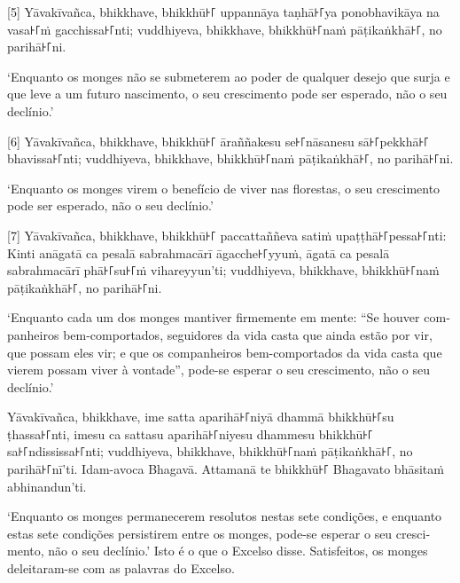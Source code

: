 \enlargethispage{2\baselineskip}

[5] Yāvakīvañca, bhikkhave, bhikkhū꜔꜒ uppannāya taṇhā꜔꜒ya ponobhavikāya na vasa꜔꜒ṁ
gacchissa꜔꜒nti; vuddhiyeva, bhikkhave, bhikkhū꜔꜒naṁ pāṭikaṅkhā꜔꜒, no parihā꜔꜒ni.

\begin{english}
  `Enquanto os monges não se submeterem ao poder de qualquer desejo que surja e
  que leve a um futuro nascimento, o seu crescimento pode ser esperado, não o
  seu declínio.'
\end{english}

[6] Yāvakīvañca, bhikkhave, bhikkhū꜔꜒ āraññakesu se꜔꜒nāsanesu sā꜔꜒pekkhā꜔꜒ bhavissa꜔꜒nti;
vuddhiyeva, bhikkhave, bhikkhū꜔꜒naṁ pāṭikaṅkhā꜔꜒, no parihā꜔꜒ni.

\begin{english}
  `Enquanto os monges virem o benefício de viver nas florestas,
  o seu crescimento pode ser esperado, não o seu declínio.'
\end{english}

[7] Yāvakīvañca, bhikkhave, bhikkhū꜔꜒ paccattaññeva satiṁ upaṭṭhā꜔꜒pessa꜔꜒nti: Kinti
anāgatā ca pesalā sabrahmacārī āgacche꜔꜒yyuṁ, āgatā ca pesalā sabrahmacārī phā꜔꜒su꜔꜒ṁ
vihareyyun'ti; vuddhiyeva, bhikkhave, bhikkhū꜔꜒naṁ pāṭikaṅkhā꜔꜒, no parihā꜔꜒ni.

\begin{english}
  `Enquanto cada um dos monges mantiver firmemente em mente: ``Se houver
  companheiros bem-comportados, seguidores da vida casta que ainda estão por
  vir, que possam eles vir; e que os companheiros bem-comportados da vida casta
  que vierem possam viver à vontade'', pode-se esperar o seu crescimento, não o
  seu declínio.'
\end{english}

Yāvakīvañca, bhikkhave, ime satta aparihā꜔꜒niyā dhammā bhikkhū꜔꜒su ṭhassa꜔꜒nti, imesu
ca sattasu aparihā꜔꜒niyesu dhammesu bhikkhū꜔꜒ sa꜔꜒ndississa꜔꜒nti; vuddhiyeva, bhikkhave,
bhikkhū꜔꜒naṁ pāṭikaṅkhā꜔꜒, no parihā꜔꜒nī'ti. Idam-avoca Bhagavā. Attamanā te bhikkhū꜔꜒
Bhagavato bhāsitaṁ abhinandun'ti.

\begin{english}
  `Enquanto os monges permanecerem resolutos nestas sete condições, e enquanto
  estas sete condições persistirem entre os monges, pode-se esperar o seu
  crescimento, não o seu declínio.' Isto é o que o Excelso disse. Satisfeitos,
  os monges deleitaram-se com as palavras do Excelso.
\end{english}
